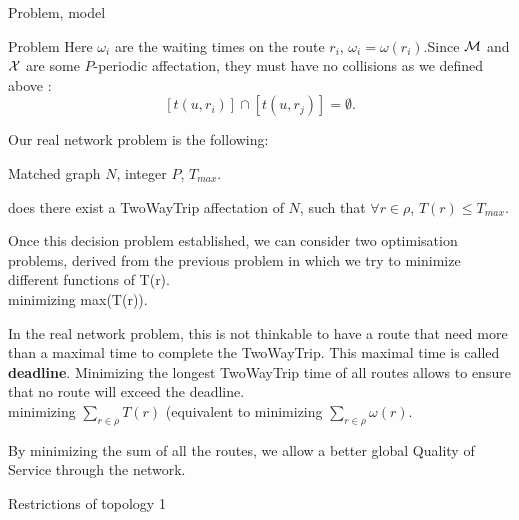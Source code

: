 \documentclass[a4paper,10pt]{report}
\begin{document}
\begin{chapter}{Problem, model}
\begin{section}{Problem}
Here $\omega_i$ are the waiting times on the route $r_i$, $\omega_i = \omega(r_i)$.Since ${\cal M}$ and ${\cal X}$
are some $P$-periodic affectation, they must have no collisions as we defined above :
$$[t(u,r_i)] \cap [t(u,r_j)] = \emptyset .$$



Our real network problem is the following:\\


 Matched graph $N$, integer $P$, $ T_{max}$.

 does there exist a TwoWayTrip affectation of $N$, such that $\forall r \in \rho$, $T(r) \le T_{max}$.

Once this decision problem established, we can consider two optimisation problems, derived from the previous problem in which
we try to minimize different functions of T(r).\\

 minimizing max(T(r)).

In the real network problem, this is not thinkable to have a route that need more than a maximal time to complete the TwoWayTrip. This maximal time is called {\bf deadline}.
Minimizing the longest TwoWayTrip time of all routes allows to ensure that no route will exceed the deadline.\\

 minimizing $\sum_{r \in \rho}  T(r)$ (equivalent to minimizing $\sum_{r \in \rho}  \omega(r)$.

By minimizing the sum of all the routes, we allow a better global Quality of Service through the network.\\
\begin{subsection}{Restrictions of topology 1}
\end{subsection}
\end{section}
\end{chapter}
\end{document}
